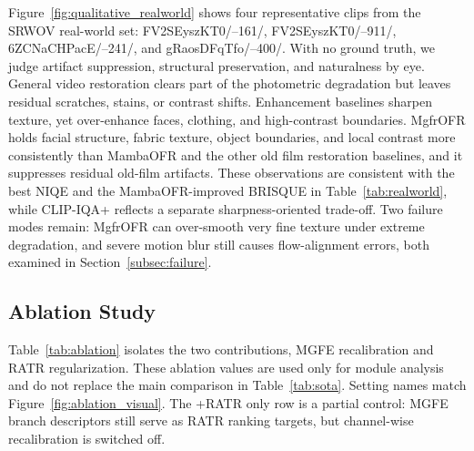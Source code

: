 \documentclass[symmetry,article,submit,pdftex,moreauthors]{Definitions/mdpi}
\begin{document}
Figure~\ref{fig:qualitative_realworld} shows four representative clips from the SRWOV real-world set: FV2SEyszKT0/--161/, FV2SEyszKT0/--911/, 6ZCNaCHPacE/--241/, and gRaosDFqTfo/--400/. With no ground truth, we judge artifact suppression, structural preservation, and naturalness by eye. General video restoration clears part of the photometric degradation but leaves residual scratches, stains, or contrast shifts. Enhancement baselines sharpen texture, yet over-enhance faces, clothing, and high-contrast boundaries. MgfrOFR holds facial structure, fabric texture, object boundaries, and local contrast more consistently than MambaOFR and the other old film restoration baselines, and it suppresses residual old-film artifacts. These observations are consistent with the best NIQE and the MambaOFR-improved BRISQUE in Table~\ref{tab:realworld}, while CLIP-IQA+ reflects a separate sharpness-oriented trade-off. Two failure modes remain: MgfrOFR can over-smooth very fine texture under extreme degradation, and severe motion blur still causes flow-alignment errors, both examined in Section~\ref{subsec:failure}.

\FloatBarrier

\subsection{Ablation Study}
\label{subsec:ablation}

Table~\ref{tab:ablation} isolates the two contributions, MGFE recalibration and RATR regularization. These ablation values are used only for module analysis and do not replace the main comparison in Table~\ref{tab:sota}. Setting names match Figure~\ref{fig:ablation_visual}. The +RATR only row is a partial control: MGFE branch descriptors still serve as RATR ranking targets, but channel-wise recalibration is switched off.
\end{document}
